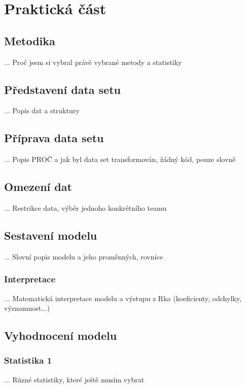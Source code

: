 \chapter{Praktická část}
\section{Metodika}
... Proč jsem si vybral právě vybrané metody a statistiky

\section{Představení data setu}
... Popis dat a struktury

\section{Příprava data setu}
... Popis PROČ a jak byl data set transformován, žádný kód, pouze slovně

\section{Omezení dat}
... Restrikce data, výběr jednoho konkrétního teamu

\section{Sestavení modelu}
... Slovní popis modelu a jeho proměnných, rovnice

\subsection{Interpretace}
... Matematická interpretace modelu a výstupu z Rka (koeficienty, odchylky, významnost...)

\section{Vyhodnocení modelu}
\subsection{Statistika 1}
... Různé statistiky, které ještě musím vybrat

